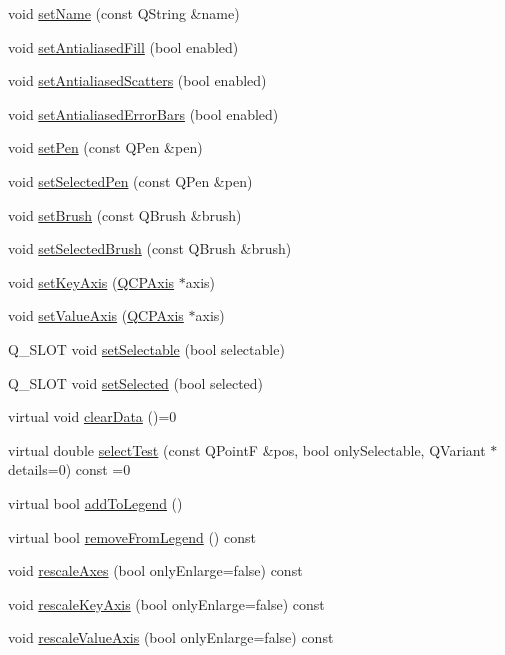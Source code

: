 \begin{DoxyCompactItemize}
\item 
void \hyperlink{classQCPAbstractPlottable_ab79c7ba76bc7fa89a4b3580e12149f1f}{set\-Name} (const \-Q\-String \&name)
\item 
void \hyperlink{classQCPAbstractPlottable_a089d6b5577120239b55c39ed27c39536}{set\-Antialiased\-Fill} (bool enabled)
\item 
void \hyperlink{classQCPAbstractPlottable_a2f03f067ede2ed4da6f7d0e4777a3f02}{set\-Antialiased\-Scatters} (bool enabled)
\item 
void \hyperlink{classQCPAbstractPlottable_a757beb744b96cf1855cca5ab9d3ecf52}{set\-Antialiased\-Error\-Bars} (bool enabled)
\item 
void \hyperlink{classQCPAbstractPlottable_ab74b09ae4c0e7e13142fe4b5bf46cac7}{set\-Pen} (const \-Q\-Pen \&pen)
\item 
void \hyperlink{classQCPAbstractPlottable_a6911603cad23ab0469b108224517516f}{set\-Selected\-Pen} (const \-Q\-Pen \&pen)
\item 
void \hyperlink{classQCPAbstractPlottable_a7a4b92144dca6453a1f0f210e27edc74}{set\-Brush} (const \-Q\-Brush \&brush)
\item 
void \hyperlink{classQCPAbstractPlottable_ae8c816874089f7a44001e8618e81a9dc}{set\-Selected\-Brush} (const \-Q\-Brush \&brush)
\item 
void \hyperlink{classQCPAbstractPlottable_a8524fa2994c63c0913ebd9bb2ffa3920}{set\-Key\-Axis} (\hyperlink{classQCPAxis}{\-Q\-C\-P\-Axis} $\ast$axis)
\item 
void \hyperlink{classQCPAbstractPlottable_a71626a07367e241ec62ad2c34baf21cb}{set\-Value\-Axis} (\hyperlink{classQCPAxis}{\-Q\-C\-P\-Axis} $\ast$axis)
\item 
\-Q\-\_\-\-S\-L\-O\-T void \hyperlink{classQCPAbstractPlottable_a22c69299eb5569e0f6bf084877a37dc4}{set\-Selectable} (bool selectable)
\item 
\-Q\-\_\-\-S\-L\-O\-T void \hyperlink{classQCPAbstractPlottable_afbd5428c2952f59d952e11ab5cd79176}{set\-Selected} (bool selected)
\item 
virtual void \hyperlink{classQCPAbstractPlottable_a86e5b8fd4b6ff4f4084e7ea4c573fc53}{clear\-Data} ()=0
\item 
virtual double \hyperlink{classQCPAbstractPlottable_a38efe9641d972992a3d44204bc80ec1d}{select\-Test} (const \-Q\-Point\-F \&pos, bool only\-Selectable, \-Q\-Variant $\ast$details=0) const =0
\item 
virtual bool \hyperlink{classQCPAbstractPlottable_a70f8cabfd808f7d5204b9f18c45c13f5}{add\-To\-Legend} ()
\item 
virtual bool \hyperlink{classQCPAbstractPlottable_aa1f350e510326d012b9a9c9249736c83}{remove\-From\-Legend} () const 
\item 
void \hyperlink{classQCPAbstractPlottable_a7e8fc3be43c27ccacd70a7bf9d74a5cd}{rescale\-Axes} (bool only\-Enlarge=false) const 
\item 
void \hyperlink{classQCPAbstractPlottable_a1acecfcca3e7fcda00fcbaa3c886386f}{rescale\-Key\-Axis} (bool only\-Enlarge=false) const 
\item 
void \hyperlink{classQCPAbstractPlottable_abfd0805eb1d955c0111a990246658324}{rescale\-Value\-Axis} (bool only\-Enlarge=false) const 
\end{DoxyCompactItemize}
